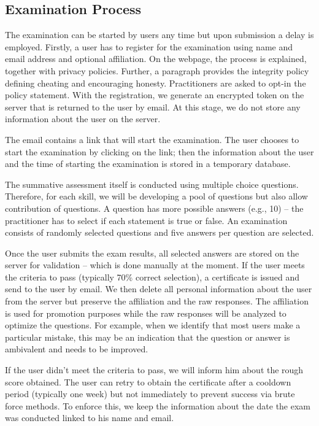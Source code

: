 \documentclass[jocse]{jocseart}
\begin{document}
\subsection{Examination Process}

The examination can be started by users any time but upon submission a delay is employed.
Firstly, a user has to register for the examination using name and email address and optional affiliation.
On the webpage, the process is explained, together with privacy policies.
Further, a paragraph provides the integrity policy defining cheating and encouraging honesty.
Practitioners are asked to opt-in the policy statement.
With the registration, we generate an encrypted token on the server that is returned to the user by email.
At this stage, we do not store any information about the user on the server.

The email contains a link that will start the examination.
The user chooses to start the examination by clicking on the link; then the information about the user and the time of starting the examination is stored in a temporary database.

The summative assessment itself is conducted using multiple choice questions.
Therefore, for each skill, we will be developing a pool of questions but also allow contribution of questions.
A question has more possible answers (e.g., 10) -- the practitioner has to select if each  statement is true or false.
An examination consists of randomly selected questions and five answers per question are selected.

Once the user submits the exam results, all selected answers are stored on the server for validation -- which is done manually at the moment.
If the user meets the criteria to pass (typically 70\% correct selection), a certificate is issued and send to the user by email.
We then delete all personal information about the user from the server but preserve the affiliation and the raw responses.
The affiliation is used for promotion purposes while the raw responses will be analyzed to optimize the questions.
For example, when we identify that most users make a particular mistake, this may be an indication that the question or answer is ambivalent and needs to be improved.

If the user didn't meet the criteria to pass, we will inform him about the rough score obtained.
The user can retry to obtain the certificate after a cooldown period (typically one week) but not immediately to prevent success via brute force methods.
To enforce this, we keep the information about the date the exam was conducted linked to his name and email.
\end{document}
